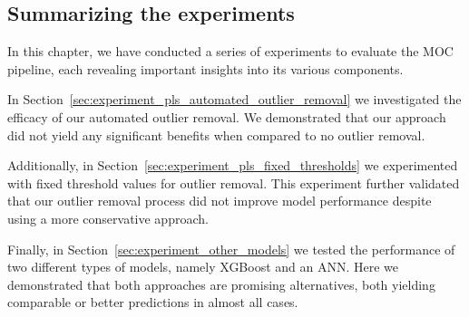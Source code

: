 \subsection{Summarizing the experiments}\label{sec:experiments_summary}
In this chapter, we have conducted a series of experiments to evaluate the MOC pipeline, each revealing important insights into its various components.

In Section~\ref{sec:experiment_pls_automated_outlier_removal} we investigated the efficacy of our automated outlier removal. 
We demonstrated that our approach did not yield any significant benefits when compared to no outlier removal.

Additionally, in Section~\ref{sec:experiment_pls_fixed_thresholds} we experimented with fixed threshold values for outlier removal.
This experiment further validated that our outlier removal process did not improve model performance despite using a more conservative approach.


Finally, in Section~\ref{sec:experiment_other_models} we tested the performance of two different types of models, namely XGBoost and an ANN. 
Here we demonstrated that both approaches are promising alternatives, both yielding comparable or better predictions in almost all cases.